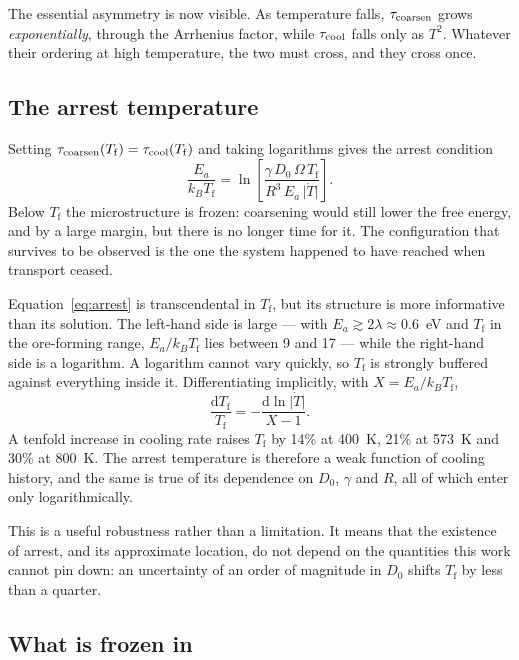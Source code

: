 \documentclass[11pt,a4paper]{article}
\newcommand{\Tf}{T_{\mathrm{f}}}
\begin{document}
The essential asymmetry is now visible. As temperature falls,
$\tau_{\rm coarsen}$ grows \emph{exponentially}, through the Arrhenius factor,
while $\tau_{\rm cool}$ falls only as $T^2$. Whatever their ordering at high
temperature, the two must cross, and they cross once.

\subsection{The arrest temperature}

Setting $\tau_{\rm coarsen}(\Tf) = \tau_{\rm cool}(\Tf)$ and taking logarithms
gives the arrest condition
\begin{equation}
\frac{E_a}{k_B \Tf}
 = \ln\!\left[ \frac{\gamma\, D_0\, \Omega\, \Tf}
                    {R^3\, E_a\, \lvert \dot{T} \rvert} \right].
\label{eq:arrest}
\end{equation}
Below $\Tf$ the microstructure is frozen: coarsening would still lower the free
energy, and by a large margin, but there is no longer time for it. The
configuration that survives to be observed is the one the system happened to
have reached when transport ceased.

Equation~\eqref{eq:arrest} is transcendental in $\Tf$, but its structure is more
informative than its solution. The left-hand side is large --- with
$E_a \gtrsim 2\lambda \approx 0.6$~eV and $\Tf$ in the ore-forming range,
$E_a/k_B\Tf$ lies between 9 and 17 --- while the right-hand side is a logarithm.
A logarithm cannot vary quickly, so $\Tf$ is strongly buffered against
everything inside it. Differentiating implicitly, with $X = E_a/k_B\Tf$,
\begin{equation}
\frac{\mathrm{d}\Tf}{\Tf} = -\frac{\mathrm{d}\ln \lvert\dot{T}\rvert}{X - 1}.
\label{eq:tfsens}
\end{equation}
A tenfold increase in cooling rate raises $\Tf$ by 14\% at 400~K, 21\% at
573~K and 30\% at 800~K. The arrest temperature is therefore a weak function of
cooling history, and the same is true of its dependence on $D_0$, $\gamma$ and
$R$, all of which enter only logarithmically.

This is a useful robustness rather than a limitation. It means that the
existence of arrest, and its approximate location, do not depend on the
quantities this work cannot pin down: an uncertainty of an order of magnitude in
$D_0$ shifts $\Tf$ by less than a quarter.

\subsection{What is frozen in}
\end{document}
